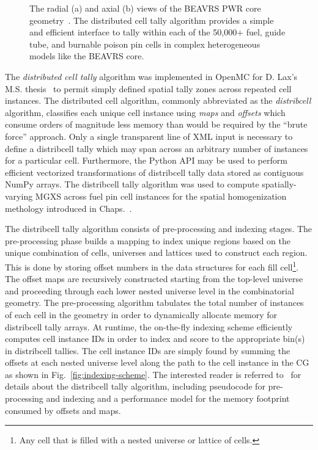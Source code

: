\begin{figure}[h!]
\begin{subfigure}{\textwidth}
  \caption{}
\end{subfigure}
\caption[Radial and axial views of the BEAVRS core]{The radial (a) and axial (b) views of the BEAVRS \ac{PWR} core geometry~\cite{horelik2013beavrs}. The distributed cell tally algorithm provides a simple and efficient interface to tally within each of the 50,000+ fuel, guide tube, and burnable poison pin cells in complex heterogeneous models like the \ac{BEAVRS} core.}
\label{fig:beavrs}
\end{figure}

The \textit{distributed cell tally} algorithm was implemented in OpenMC for D. Lax's M.S. thesis~\cite{lax2014distribcell} to permit simply defined spatial tally zones across repeated cell instances. The distributed cell algorithm, commonly abbreviated as the \textit{distribcell} algorithm, classifies each unique cell instance using \textit{maps} and \textit{offsets} which consume orders of magnitude less memory than would be required by the ``brute force'' approach. Only a single transparent line of \ac{XML} input is necessary to define a distribcell tally which may span across an arbitrary number of instances for a particular cell. Furthermore, the Python \ac{API} may be used to perform efficient vectorized transformations of distribcell tally data stored as contiguous NumPy arrays. The distribcell tally algorithm was used to compute spatially-varying \ac{MGXS} across fuel pin cell instances for the spatial homogenization methology introduced in Chaps.~.

The distribcell tally algorithm consists of pre-processing and indexing stages. The pre-processing phase builds a mapping to index unique regions based on the unique combination of cells, universes and lattices used to construct each region. This is done by storing offset numbers in the data structures for each fill cell\footnote{Any cell that is filled with a nested universe or lattice of cells.}. The offset maps are recursively constructed starting from the top-level universe and proceeding through each lower nested universe level in the combinatorial geometry. The pre-processing algorithm tabulates the total number of instances of each cell in the geometry in order to dynamically allocate memory for distribcell tally arrays. At runtime, the on-the-fly indexing scheme efficiently computes cell instance IDs in order to index and score to the appropriate bin(s) in distribcell tallies. The cell instance IDs are simply found by summing the offsets at each nested universe level along the path to the cell instance in the \ac{CG} as shown in Fig.~\ref{fig:indexing-scheme}. The interested reader is referred to~\cite{lax2014distribcell} for details about the distribcell tally algorithm, including pseudocode for pre-processing and indexing and a performance model for the memory footprint consumed by offsets and maps.


